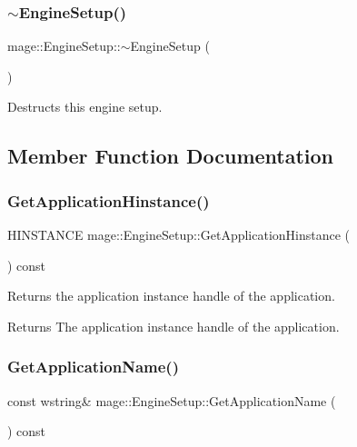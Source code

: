 \subsubsection{\texorpdfstring{$\sim$\+Engine\+Setup()}{~EngineSetup()}}
{\footnotesize\ttfamily mage\+::\+Engine\+Setup\+::$\sim$\+Engine\+Setup (\begin{DoxyParamCaption}{ }\end{DoxyParamCaption})\hspace{0.3cm}{\ttfamily [default]}}

Destructs this engine setup. 

\subsection{Member Function Documentation}
\hypertarget{classmage_1_1_engine_setup_a2d6377386d47058252d77d168d5e60ec}{}\label{classmage_1_1_engine_setup_a2d6377386d47058252d77d168d5e60ec} 
\subsubsection{\texorpdfstring{Get\+Application\+Hinstance()}{GetApplicationHinstance()}}
{\footnotesize\ttfamily H\+I\+N\+S\+T\+A\+N\+CE mage\+::\+Engine\+Setup\+::\+Get\+Application\+Hinstance (\begin{DoxyParamCaption}{ }\end{DoxyParamCaption}) const\hspace{0.3cm}{\ttfamily [noexcept]}}

Returns the application instance handle of the application.

\begin{DoxyReturn}{Returns}
The application instance handle of the application. 
\end{DoxyReturn}
\hypertarget{classmage_1_1_engine_setup_ab79015dba68069256ed42595b30a5728}{}\label{classmage_1_1_engine_setup_ab79015dba68069256ed42595b30a5728} 
\subsubsection{\texorpdfstring{Get\+Application\+Name()}{GetApplicationName()}}
{\footnotesize\ttfamily const wstring\& mage\+::\+Engine\+Setup\+::\+Get\+Application\+Name (\begin{DoxyParamCaption}{ }\end{DoxyParamCaption}) const\hspace{0.3cm}{\ttfamily [noexcept]}}

